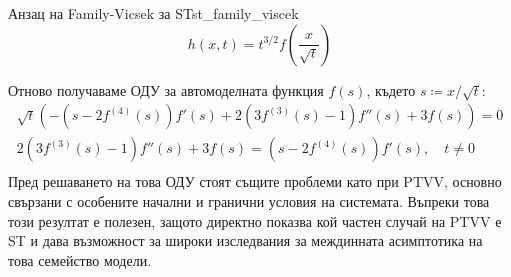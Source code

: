 \begin{result}{Анзац на Family-Vicsek за ST}{st_family_viscek}
    \begin{equation*}
        h(x,t) = {t^{3/2}}f\left( {\frac{{{x}}}{{{\sqrt{t}}}}} \right)
    \end{equation*}
\end{result}
\noindent Отново получаваме ОДУ за автомоделната функция $f(s)$, където $s \coloneqq x/\sqrt{t}$:
\begin{align*}
    \sqrt t \left( { - \left( {s - 2{f^{(4)}}(s)} \right)f'(s) + 2\left( {3{f^{(3)}}(s) - 1} \right)f''(s) + 3f(s)} \right) = 0 \\
     2\left( {3{f^{(3)}}(s) - 1} \right)f''(s) + 3f(s) = \left( {s - 2{f^{(4)}}(s)} \right)f'(s), \quad t \ne 0 \\
\end{align*}
Пред решаването на това ОДУ стоят същите проблеми като при PTVV, основно свързани с особените начални и гранични условия на системата. Въпреки това този резултат е полезен, защото директно показва кой частен случай на PTVV е ST и дава възможност за широки изследвания за междинната асимптотика на това семейство модели.